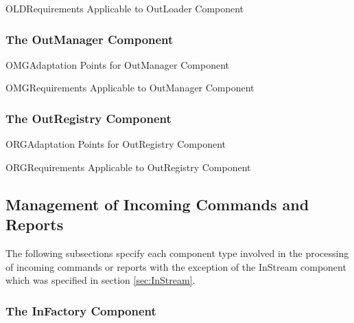 \documentclass{pnp_article}
\begin{document}
\begin{crReq}{OLD}{Requirements Applicable to OutLoader Component}
\end{crReq}

\newpage
\subsubsection{The OutManager Component}\label{sec:OutManager}


\begin{crAp}{OMG}{Adaptation Points for OutManager Component}
\end{crAp}

\begin{crReq}{OMG}{Requirements Applicable to OutManager Component}
\end{crReq}

\subsubsection{The OutRegistry Component}\label{sec:OutRegistry}


\begin{crAp}{ORG}{Adaptation Points for OutRegistry Component}
\end{crAp}

\begin{crReq}{ORG}{Requirements Applicable to OutRegistry Component}
\end{crReq}

\subsection{Management of Incoming Commands and Reports}\label{sec:ManagementOfIncomingCmdAndRep}


The following subsections specify each component type involved in the processing of incoming commands or reports with the exception of the InStream component which was specified in section \ref{sec:InStream}. 

\subsubsection{The InFactory Component}\label{sec:InFactory}
\end{document}

